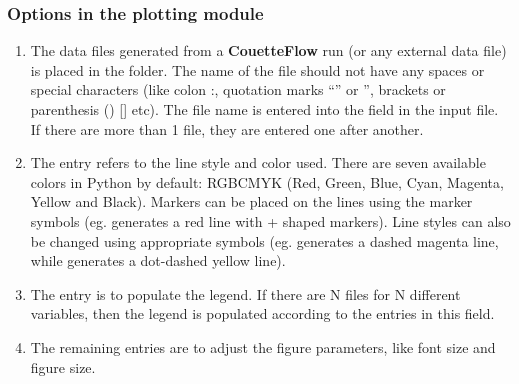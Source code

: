 \documentclass[letterpaper,10pt,english]{sphinxmanual}
\begin{document}
\subsubsection{Options in the plotting module}
\label{\detokenize{couettepyfiles/plot:options-in-the-plotting-module}}\begin{enumerate}
\item {} 
The data files generated from a {\color{red}\bfseries{}\textbar{}CouetteFlow\textbar{}} run (or any external data file) is placed in the  folder. The name of the file should not have any spaces or special characters (like colon :, quotation marks “” or ”, brackets or parenthesis () {[}{]} etc). The file name is entered into the  field in the input file. If there are more than 1 file, they are entered one after another.

\item {} 
The  entry refers to the line style and color used. There are seven available colors in Python by default: RGBCMYK (Red, Green, Blue, Cyan, Magenta, Yellow and Black). Markers can be placed on the lines using the marker symbols (eg.  generates a red line with + shaped markers). Line styles can also be changed using appropriate symbols (eg.  generates a dashed magenta line, while  generates a dot-dashed yellow line).

\item {} 
The  entry is to populate the legend. If there are N files for N different variables, then the legend is populated according to the entries in this field.

\item {} 
The remaining entries are to adjust the figure parameters, like font size and figure size.

\end{enumerate}
\end{document}
